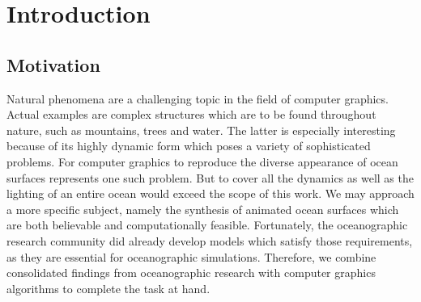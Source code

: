 \chapter{Introduction}
\label{ch:intro}
%
\section{Motivation}
\label{sec:motivation}
Natural phenomena are a challenging topic in the field of computer graphics.
Actual examples are complex structures which are to be found throughout nature,
such as mountains, trees and water. The latter is especially interesting
because of its highly dynamic form which poses a variety of sophisticated problems.
For computer graphics to reproduce the diverse appearance of ocean surfaces
represents one such problem.
But to cover all the dynamics as well as the lighting of an entire ocean would
exceed the scope of this work.
We may approach a more specific subject, namely the synthesis of animated ocean
surfaces which are both believable and computationally feasible.
Fortunately, the oceanographic research community did already develop models
which satisfy those requirements, as they are essential for oceanographic
simulations. Therefore, we combine consolidated findings from oceanographic
research with computer graphics algorithms to complete the task at hand.
%
%
%
%
% 
% 
% 
%
%
%
